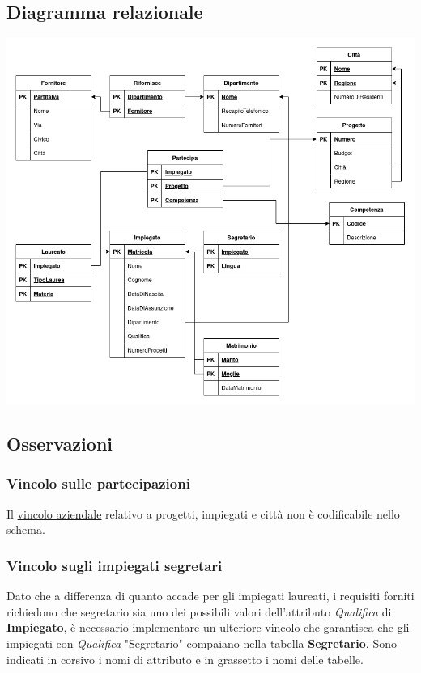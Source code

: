 \documentclass{article}
\begin{document}
\newpage

\subsection{Diagramma relazionale}
\includegraphics[width=1\textwidth]{r.png}

\subsection{Osservazioni}

\subsubsection{Vincolo sulle partecipazioni}
Il \hyperlink{page.9}{vincolo aziendale} relativo a progetti, impiegati e città non è codificabile nello schema.

\subsubsection{Vincolo sugli impiegati segretari}
Dato che a differenza di quanto accade per gli impiegati laureati, i requisiti forniti richiedono che segretario sia uno dei possibili valori dell'attributo \textit{Qualifica} di \textbf{Impiegato}, è necessario implementare un ulteriore vincolo che garantisca che gli impiegati con \textit{Qualifica} "Segretario" compaiano nella tabella \textbf{Segretario}.
\newline
\newline
Sono indicati in corsivo i nomi di attributo e in grassetto i nomi delle tabelle.
\end{document}
